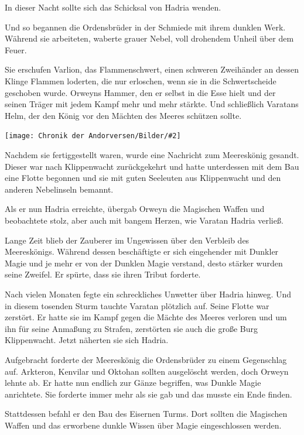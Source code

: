 \documentclass[10pt, a4paper, oneside]{book}
\newcommand{\bildmitts}[2][height=0.32\textwidth,width=0.48\textwidth,keepaspectratio]{%
    \begin{center}
        \texttt{[image: Chronik der Andorversen/Bilder/\#2]}
    \end{center}
}
\begin{document}
\begin{multicols}{2}
In dieser Nacht sollte sich das Schicksal von Hadria wenden.\bigskip



Und so begannen die Ordensbrüder in der Schmiede mit ihrem dunklen Werk.  Während sie arbeiteten, waberte grauer Nebel, voll drohendem Unheil über dem Feuer.\bigskip

Sie erschufen Varlion, das Flammenschwert, einen schweren Zweihänder an dessen Klinge Flammen loderten, die nur erloschen, wenn sie in die Schwertscheide geschoben wurde. Orweyns Hammer, den er selbst in die Esse hielt und der seinen Träger mit jedem Kampf mehr und mehr stärkte. Und schließlich Varatans Helm, der den König vor den Mächten des Meeres schützen sollte.\bigskip

\bildmitts{Die Zwei Orden (2014).jpeg}

Nachdem sie fertiggestellt waren, wurde eine Nachricht zum Meereskönig gesandt. Dieser war nach Klippenwacht zurückgekehrt und hatte unterdessen mit dem Bau eine Flotte begonnen und sie mit guten Seeleuten aus Klippenwacht und den anderen Nebelinseln bemannt.\bigskip

Als er nun Hadria erreichte, übergab Orweyn die Magischen Waffen und beobachtete stolz, aber auch mit bangem Herzen, wie Varatan Hadria verließ.\bigskip

Lange Zeit blieb der Zauberer im Ungewissen über den Verbleib des Meereskönigs. Während dessen beschäftigte er sich eingehender mit Dunkler Magie und je mehr er von der Dunklen Magie verstand, desto stärker wurden seine Zweifel. Er spürte, dass sie ihren Tribut forderte.\bigskip

Nach vielen Monaten fegte ein schreckliches Unwetter über Hadria hinweg. Und in diesem tosenden Sturm tauchte Varatan plötzlich auf. Seine Flotte war zerstört. Er hatte sie im Kampf gegen die Mächte des Meeres verloren und um ihn für seine Anmaßung zu Strafen, zerstörten sie auch die große Burg Klippenwacht. Jetzt näherten sie sich Hadria.\bigskip

Aufgebracht forderte der Meereskönig die Ordensbrüder zu einem Gegenschlag auf. Arkteron, Kenvilar und Oktohan sollten ausgelöscht werden, doch Orweyn lehnte ab. Er hatte nun endlich zur Gänze begriffen, was Dunkle Magie anrichtete. Sie forderte immer mehr als sie gab und das musste ein Ende finden.\bigskip

Stattdessen befahl er den Bau des Eisernen Turms. Dort sollten die Magischen Waffen und das erworbene dunkle Wissen über Magie eingeschlossen werden.\bigskip


\end{multicols}
\end{document}
